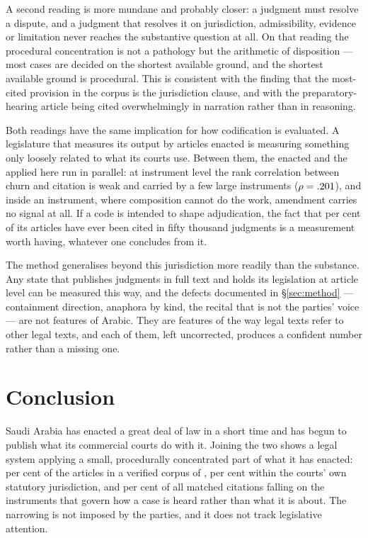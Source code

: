 \documentclass[11pt]{article}
\begin{document}
A second reading is more mundane and probably closer: a judgment must resolve
a dispute, and a judgment that resolves it on jurisdiction, admissibility,
evidence or limitation never reaches the substantive question at all. On that
reading the procedural concentration is not a pathology but the arithmetic of
disposition --- most cases are decided on the shortest available ground, and
the shortest available ground is procedural. This is consistent with the
finding that the most-cited provision in the corpus is the jurisdiction
clause, and with the preparatory-hearing article being cited overwhelmingly
in narration rather than in reasoning.

Both readings have the same implication for how codification is evaluated. A
legislature that measures its output by articles enacted is measuring
something only loosely related to what its courts use. Between them, the
enacted and the applied here run in parallel: at instrument level the rank
correlation between churn and citation is weak and carried by a few large
instruments ($\rho = .201{}$), and inside an instrument, where
composition cannot do the work, amendment carries no signal at all.
If a code is intended to shape adjudication, the fact that
\nCivilShare{} per cent of its articles have ever been cited in fifty
thousand judgments is a measurement worth having, whatever one concludes
from it.

The method generalises beyond this jurisdiction more readily than the
substance. Any state that publishes judgments in full text and holds its
legislation at article level can be measured this way, and the defects
documented in §\ref{sec:method} --- containment direction, anaphora by kind,
the recital that is not the parties' voice --- are not features of Arabic.
They are features of the way legal texts refer to other legal texts, and each
of them, left uncorrected, produces a confident number rather than a missing
one.

\section{Conclusion}

Saudi Arabia has enacted a great deal of law in a short time and has begun to
publish what its commercial courts do with it. Joining the two shows a legal
system applying a small, procedurally concentrated part of what it has
enacted: \nArticlesCitedShare{} per cent of the articles in a verified corpus
of \nRegistryArticles{}, \nScopeNarrowShare{} per cent within the courts'
own statutory jurisdiction, and \nProceduralShare{} per cent of all matched
citations falling on the instruments that govern how a case is heard rather
than what it is about. The narrowing is not imposed by the parties, and it
does not track legislative attention.
\end{document}
